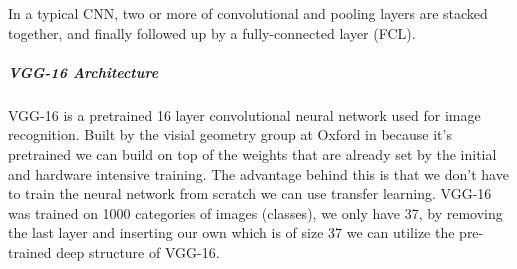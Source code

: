 In a typical CNN, two or more of convolutional and pooling layers are stacked together, and finally followed up by a fully-connected layer (FCL).

\subparagraph{VGG-16 Architecture}
VGG-16 is a pretrained 16 layer convolutional neural network used for image recognition. Built by the visial geometry group at Oxford in \citeyear{vgg16-arxiv} \cite{vgg16-arxiv} because it's pretrained we can build on top of the weights that are already set by the initial and hardware intensive training. The advantage behind this is that we don't have to train the neural network from scratch we can use transfer learning. VGG-16 was trained on 1000 categories of images (classes), we only have 37, by removing the last layer and inserting our own which is of size 37 we can utilize the pre-trained deep structure of VGG-16.


